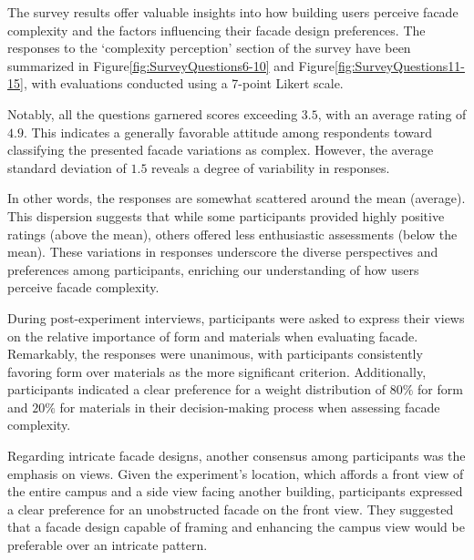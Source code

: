 
The survey results offer valuable insights into how building users perceive facade complexity and the factors influencing their facade design preferences.
The responses to the `complexity perception' section of the survey have been summarized in Figure\ref{fig:SurveyQuestions6-10} and Figure\ref{fig:SurveyQuestions11-15}, with evaluations conducted using a 7-point Likert scale.


Notably, all the questions garnered scores exceeding \(3.5\), with an average rating of \(4.9\).
This indicates a generally favorable attitude among respondents toward classifying the presented facade variations as complex.
However, the average standard deviation of \(1.5\) reveals a degree of variability in responses.

In other words, the responses are somewhat scattered around the mean (average).
This dispersion suggests that while some participants provided highly positive ratings (above the mean), others offered less enthusiastic assessments (below the mean).
These variations in responses underscore the diverse perspectives and preferences among participants, enriching our understanding of how users perceive facade complexity.






During post-experiment interviews, participants were asked to express their views on the relative importance of form and materials when evaluating facade.
Remarkably, the responses were unanimous, with participants consistently favoring form over materials as the more significant criterion.
Additionally, participants indicated a clear preference for a weight distribution of \(80\%\) for form and \(20\%\) for materials in their decision-making process when assessing facade complexity.

Regarding intricate facade designs, another consensus among participants was the emphasis on views.
Given the experiment's location, which affords a front view of the entire campus and a side view facing another building, participants expressed a clear preference for an unobstructed facade on the front view.
They suggested that a facade design capable of framing and enhancing the campus view would be preferable over an intricate pattern.

